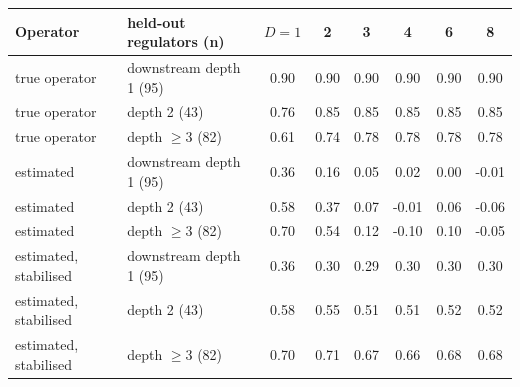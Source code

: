 \begin{tabular}{llcccccc}
\toprule
Operator & held-out regulators (n) & $D{=}1$ & 2 & 3 & 4 & 6 & 8 \\
\midrule
true operator & downstream depth 1 (95) & 0.90 & 0.90 & 0.90 & 0.90 & 0.90 & 0.90 \\
true operator & depth 2 (43) & 0.76 & 0.85 & 0.85 & 0.85 & 0.85 & 0.85 \\
true operator & depth $\ge3$ (82) & 0.61 & 0.74 & 0.78 & 0.78 & 0.78 & 0.78 \\
estimated & downstream depth 1 (95) & 0.36 & 0.16 & 0.05 & 0.02 & 0.00 & -0.01 \\
estimated & depth 2 (43) & 0.58 & 0.37 & 0.07 & -0.01 & 0.06 & -0.06 \\
estimated & depth $\ge3$ (82) & 0.70 & 0.54 & 0.12 & -0.10 & 0.10 & -0.05 \\
estimated, stabilised & downstream depth 1 (95) & 0.36 & 0.30 & 0.29 & 0.30 & 0.30 & 0.30 \\
estimated, stabilised & depth 2 (43) & 0.58 & 0.55 & 0.51 & 0.51 & 0.52 & 0.52 \\
estimated, stabilised & depth $\ge3$ (82) & 0.70 & 0.71 & 0.67 & 0.66 & 0.68 & 0.68 \\
\bottomrule
\end{tabular}
